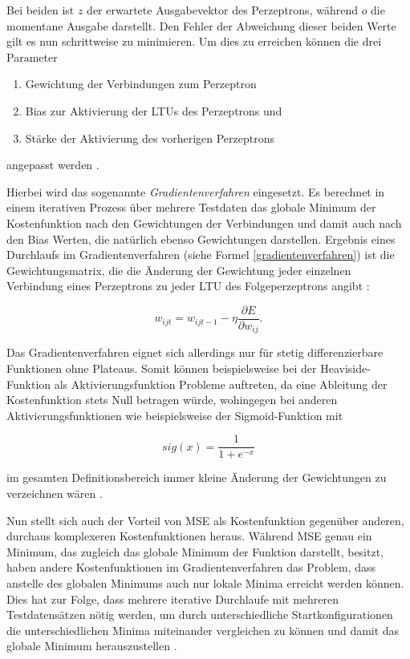 Bei beiden ist $z$ der erwartete Ausgabevektor des Perzeptrons, während $o$ die momentane Ausgabe darstellt. Den Fehler der Abweichung dieser beiden Werte gilt es nun schrittweise zu minimieren. Um dies zu erreichen können die drei Parameter

\begin{enumerate}
	\item Gewichtung der Verbindungen zum Perzeptron
	\item Bias zur Aktivierung der LTUs des Perzeptrons und
	\item Stärke der Aktivierung des vorherigen Perzeptrons
\end{enumerate}

angepasst werden \cite{AurelienGeron.2018}. 

Hierbei wird das sogenannte \textit{Gradientenverfahren} eingesetzt. Es berechnet in einem iterativen Prozess über mehrere Testdaten das globale Minimum der Kostenfunktion nach den Gewichtungen der Verbindungen und damit auch nach den Bias Werten, die natürlich ebenso Gewichtungen darstellen. Ergebnis eines Durchlaufs im Gradientenverfahren (siehe Formel \ref{gradientenverfahren}) ist die Gewichtungsmatrix, die die Änderung der Gewichtung jeder einzelnen Verbindung eines Perzeptrons zu jeder LTU des Folgeperzeptrons angibt \cite{AurelienGeron.2018}:

\begin{equation} \label{gradientenverfahren}
w_{ijt} = w_{ijt-1} - \eta\frac{\partial E}{\partial w_{ij}}.
\end{equation}

Das Gradientenverfahren eignet sich allerdings nur für stetig differenzierbare Funktionen ohne Plateaus. Somit können beispielsweise bei der Heaviside-Funktion als Aktivierungsfunktion Probleme auftreten, da eine Ableitung der Kostenfunktion stets Null betragen würde, wohingegen bei anderen Aktivierungsfunktionen wie beispielsweise der Sigmoid-Funktion mit 

\begin{equation}
sig(x) = \frac{1}{1 + e^{-x}}
\end{equation}

im gesamten Definitionsbereich immer kleine Änderung der Gewichtungen zu verzeichnen wären \cite{AurelienGeron.2018}.

Nun stellt sich auch der Vorteil von MSE als Kostenfunktion gegenüber anderen, durchaus komplexeren Kostenfunktionen heraus. Während MSE genau ein Minimum, das zugleich das globale Minimum der Funktion darstellt, besitzt, haben andere Kostenfunktionen im Gradientenverfahren das Problem, dass anstelle des globalen Minimums auch nur lokale Minima erreicht werden können. Dies hat zur Folge, dass mehrere iterative Durchlaufe mit mehreren Testdatensätzen nötig werden, um durch unterschiedliche Startkonfigurationen die unterschiedlichen Minima miteinander vergleichen zu können und damit das globale Minimum herauszustellen \cite{AurelienGeron.2018}.

